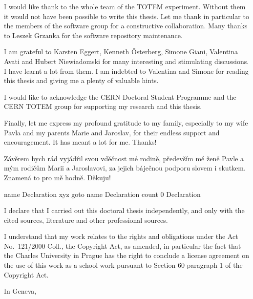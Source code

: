 I would like thank to the whole team of the TOTEM experiment. Without them it would not have been possible to write this thesis. Let me thank in particular to the members of the software group for a constructive collaboration. Many thanks to Leszek Grzanka for the software repository maintenance. 

I am grateful to Karsten Eggert, Kenneth \"Osterberg, Simone Giani, Valentina Avati and Hubert Niewiadomski for many interesting and stimulating discussions. I have learnt a lot from them. I am indebted to Valentina and Simone for reading this thesis and giving me a plenty of valuable hints.

I would like to acknowledge the CERN Doctoral Student Programme and the CERN TOTEM group for supporting my research and this thesis.

Finally, let me express my profound gratitude to my family, especially to my wife Pavla and my parents Marie and Jaroslav, for their endless support and 
encouragement. It has meant a lot for me. Thanks!

\baselineskip

Závěrem bych rád vyjádřil svou vděčnost mé rodině, především mé ženě Pavle a mým rodičům Marii a Jaroslavovi, za jejich báječnou podporu slovem i skutkem. Znamená to pro mě hodně. Děkuju!


\egroup

\eject
\forceoddpage


\pdfdest name {Declaration} xyz
\pdfoutline goto name {Declaration} count 0 {Declaration}%

I declare that I carried out this doctoral thesis independently, and only with the cited sources, literature and other professional sources.

I understand that my work relates to the rights and obligations under the Act No.~121/2000 Coll., the Copyright Act, as amended, in particular the fact that the Charles University in Prague has the right to conclude a license agreement on the use of this work as a school work pursuant to Section 60 paragraph 1 of the Copyright Act.

\baselineskip

In Geneva, 

\baselineskip
{}

\vfil\eject
\forceoddpage

